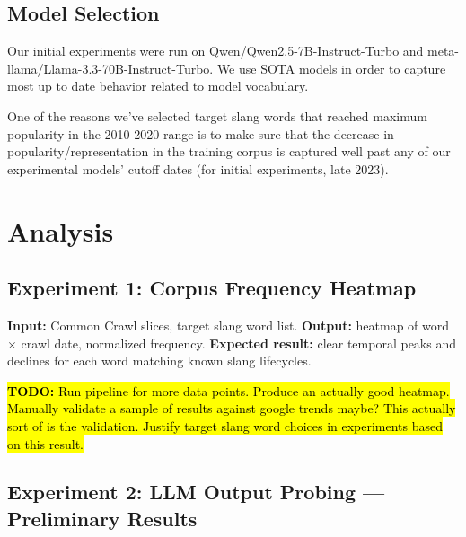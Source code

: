 \documentclass[11pt]{article}
\newcommand{\todo}[1]{\hl{\textbf{TODO:} #1}}
\begin{document}

\subsection{Model Selection}

Our initial experiments were run on Qwen/Qwen2.5-7B-Instruct-Turbo and meta-llama/Llama-3.3-70B-Instruct-Turbo. We use SOTA models in order to capture most up to date behavior related to model vocabulary.

One of the reasons we've selected target slang words that reached maximum popularity in the 2010-2020 range is to make sure that the decrease in popularity/representation in the training corpus is captured well past any of our experimental models' cutoff dates (for initial experiments, late 2023).


\section{Analysis}

\subsection{Experiment 1: Corpus Frequency Heatmap}
\label{sec:exp1}

\textbf{Input:} Common Crawl slices, target slang word
list. \textbf{Output:} heatmap of word $\times$ crawl date, normalized frequency. \textbf{Expected result:} clear temporal peaks and declines for each word matching known slang lifecycles.

\todo{Run pipeline for more data points. Produce an actually good heatmap. Manually validate a sample of results against google trends maybe? This actually sort of is the validation. Justify target slang word choices in experiments based on this result.}

\subsection{Experiment 2: LLM Output Probing --- Preliminary Results}
\label{sec:exp2}
\end{document}
